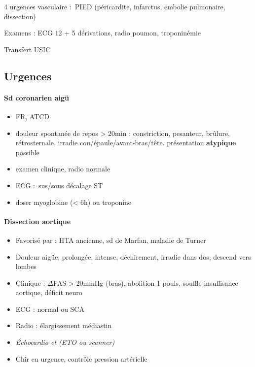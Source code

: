 \documentclass{article}
\begin{document}
4 urgences vasculaire : PIED (péricardite, infarctus, embolie pulmonaire,
dissection)

Examens : ECG 12 + 5 dérivations, radio poumon, troponinémie

Transfert USIC

\subsection{Urgences}

\paragraph{Sd coronarien aigü}
\begin{itemize}
  \item FR, ATCD
  \item douleur spontanée de repos > 20min : constriction, pesanteur, brûlure,
    rétrosternale, irradie  cou/épaule/avant-bras/tête. \danger présentation
    \textbf{atypique} possible
  \item examen clinique, radio normale
  \item ECG : sus/sous décalage ST
  \item doser myoglobine (< 6h) ou troponine
\end{itemize}

\paragraph{Dissection aortique}
\begin{itemize}
  \item Favorisé par : HTA ancienne, sd de Marfan, maladie de Turner
  \item Douleur aigüe, prolongée, intense, déchirement, irradie dans dos, descend
    vers lombes
  \item Clinique : $\Delta$PAS > 20mmHg (bras), abolition 1 pouls, souffle
    insuffisance aortique, déficit neuro
  \item ECG : normal ou SCA
  \item Radio : élargissement médiastin
  \item \textit{Échocardio et (ETO ou scanner)} 
  \item Chir en urgence, contrôle pression artérielle
\end{itemize}
\end{document}
